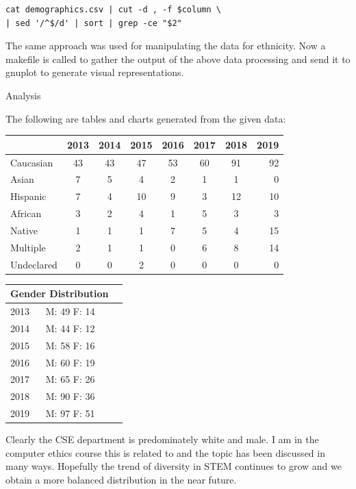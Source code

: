 \documentclass[12pt, letterpaper, twoside]{article}
\begin{document}
\begin{lstlisting}
cat demographics.csv | cut -d , -f $column \
| sed '/^$/d' | sort | grep -ce "$2"
\end{lstlisting}

The same approach was used for manipulating the data for ethnicity.  Now a makefile is called to gather the output of the above data processing and send it to gnuplot to generate visual representations.\par

\newpage

{\centering\large Analysis\par}

The following are tables and charts generated from the given data:

\centering


\begin{tabular}{l*{6}{c}r}
              & 2013 & 2014 & 2015 & 2016 & 2017  & 2018 & 2019 \\
\hline
Caucasian         & 43 & 43 & 47 & 53 & 60 & 91 & 92  \\
Asian             & 7 & 5 & 4 & 2 &  1 & 1 &  0  \\
Hispanic          & 7 & 4 & 10 & 9 &  3 & 12 &  10  \\
African          & 3 & 2 & 4 & 1 &  5 & 3 &  3  \\
Native              & 1 & 1 & 1 & 7 &  5 & 4 &  15  \\
Multiple          & 2 & 1 & 1 & 0 &  6 & 8 &  14  \\
Undeclared          & 0 & 0 & 2 & 0 &  0 & 0 &  0  \\
\end{tabular}



\begin{tabular}{ |l|l|l }
  \hline
  \multicolumn{2}{|c|}{Gender Distribution} \\
  \hline
  2013 & M: 49 F: 14  \\
  2014 & M: 44 F: 12 \\
  2015 & M: 58 F: 16 \\
  2016 & M: 60 F: 19 \\
  2017 & M: 65 F: 26 \\
  2018 & M: 90 F: 36 \\
  2019 & M: 97 F: 51 \\

  \hline
\end{tabular}

Clearly the CSE department is predominately white and male.  I am in the
computer ethics course this is related to and the topic has been discussed in
many ways.  Hopefully the trend of diversity in STEM continues to grow and we
obtain a more balanced distribution in the near future.
\end{document}

